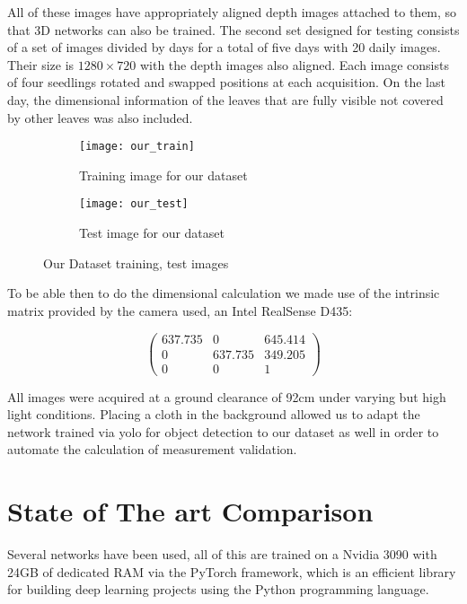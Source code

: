 All of these images have appropriately aligned depth images attached to them, so that 3D networks can also be trained. The second
set designed for testing consists of a set of images divided by days for a total of five days with 20 daily images. Their size is $1280\times 720$ with the depth images also
aligned. Each image consists of four seedlings rotated and swapped positions at each acquisition. On the last day, the dimensional information of the leaves that are
fully visible not covered by other leaves was also included.

\begin{figure}[ht] 
  \centering
  \begin{subfigure}{.5\textwidth}
    \centering
    \texttt{[image: our\_train]}
    \caption{Training image for our dataset}
    \label{fig:sub5}
  \end{subfigure}%
  \begin{subfigure}{.5\textwidth}
    \centering
    \texttt{[image: our\_test]}
    \caption{Test image for our dataset}
    \label{fig:sub6}
  \end{subfigure}
  \caption{Our Dataset training, test images}
  \label{fig:ourData}
\end{figure}

To be able then to do the dimensional calculation we made use of the intrinsic matrix provided by the camera used, an Intel RealSense D435:

$$
\begin{pmatrix}
    637.735 & 0       & 645.414 \\     
    0       & 637.735 & 349.205 \\
    0       &       0 & 1
\end{pmatrix}
$$

All images were acquired at a ground clearance of 92cm under varying but high light conditions. Placing a cloth in the background allowed us to adapt the network
trained via yolo for object detection to our dataset as well in order to automate the calculation of measurement validation.


\section{State of The art Comparison}
Several networks have been used, all of this are trained on a Nvidia 3090 with 24GB of dedicated RAM via the PyTorch framework, which is an efficient library for
building deep learning projects using the Python programming language. 



